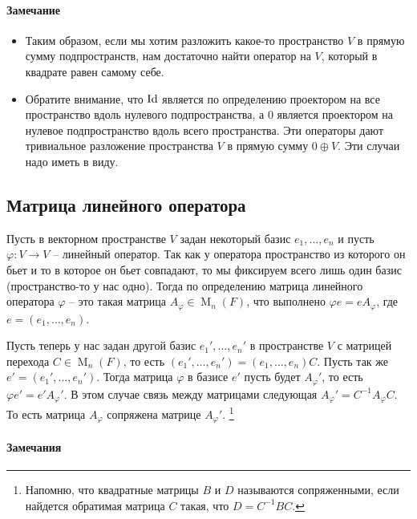 \paragraph{Замечание}

\begin{itemize}
\item Таким образом, если мы хотим разложить какое-то пространство $V$ в прямую сумму подпространств, нам достаточно найти оператор на $V$, который в квадрате равен самому себе.

\item Обратите внимание, что $\operatorname{Id}$ является по определению проектором на все пространство вдоль  нулевого подпространства, а $0$ является проектором на нулевое подпространство вдоль всего пространства.
Эти операторы дают тривиальное разложение пространства $V$ в прямую сумму $0 \oplus V$.
Эти случаи надо иметь в виду.
\end{itemize}

\subsection{Матрица линейного оператора}

Пусть в векторном пространстве $V$ задан  некоторый базис $e_1,\ldots, e_n$ и пусть $\varphi \colon V\to V$ -- линейный оператор.
Так как у оператора пространство из которого он бьет и то в которое он бьет совпадают, то мы фиксируем всего лишь один базис (пространство-то у нас одно).
Тогда по определению матрица линейного оператора $\varphi$ -- это такая матрица $A_\varphi\in \operatorname{M}_{n}(F)$, что выполнено $\varphi e = e A_\varphi$, где $e = (e_1,\ldots,e_n)$.

Пусть теперь у нас задан другой базис $e_1',\ldots,e_n'$ в пространстве $V$ с матрицей перехода $C\in \operatorname{M}_n(F)$, то есть $(e_1',\ldots,e_n') = (e_1,\ldots,e_n)C$.
Пусть так же $e' = (e_1',\ldots,e_n')$.
Тогда матрица $\varphi$ в базисе $e'$ пусть будет $A_\varphi'$, то есть $\varphi e' = e' A_\varphi'$.
В этом случае связь между матрицами следующая $A_\varphi' = C^{-1}A_\varphi C$.
То есть матрица $A_\varphi$ сопряжена матрице $A_\varphi'$.%
\footnote{Напомню, что квадратные матрицы $B$ и $D$ называются сопряженными, если найдется обратимая матрица $C$ такая, что $D= C^{-1}BC$.}

\paragraph{Замечания}


